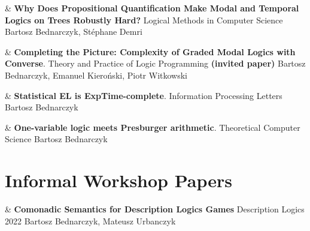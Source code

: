 \documentclass[10pt,a4paper]{article}
\begin{document}
\begin{EntriesTableYear}
  &
  \textbf{Why Does Propositional Quantification Make Modal and Temporal Logics on Trees Robustly Hard?}
  \newline
  Logical Methods in Computer Science
  \newline
 Bartosz Bednarczyk, Stéphane Demri
  \\
\end{EntriesTableYear}

\begin{EntriesTableYear}
  &
  \textbf{Completing the Picture: Complexity of Graded Modal Logics with Converse}.
  \newline
  Theory and Practice of Logic Programming \textbf{(invited paper)}
  \newline
 Bartosz Bednarczyk, Emanuel Kieroński, Piotr Witkowski
  \\
\end{EntriesTableYear}

\begin{EntriesTableYear}
  &
  \textbf{Statistical EL is ExpTime-complete}.
  \newline
  Information Processing Letters
  \newline
 Bartosz Bednarczyk
  \\
\end{EntriesTableYear}

\begin{EntriesTableYear}
  &
  \textbf{One-variable logic meets Presburger arithmetic}.
  \newline
  Theoretical Computer Science
  \newline
 Bartosz Bednarczyk
  \\
\end{EntriesTableYear}



\section{Informal Workshop Papers}

\begin{EntriesTableYear}
  &
  \textbf{Comonadic Semantics for Description Logics Games}
  \newline
  Description Logics 2022
  \newline
  Bartosz Bednarczyk, Mateusz Urbanczyk
  \\
\end{EntriesTableYear}
\end{document}
